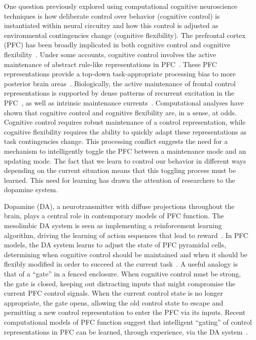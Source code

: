 One question previously explored using computational cognitive neuroscience techniques is how deliberate control over behavior (cognitive control) is instantiated within neural circuitry and how this control is adjusted as environmental contingencies change (cognitive flexibility). The prefrontal cortex (PFC) has been broadly implicated in both cognitive control and cognitive flexibility~\cite{Stuss:2000:WCSTLesion,Stuss:2001:StroopLesion}. Under some accounts, cognitive control involves the active maintenance of abstract rule-like representations in PFC~\cite{NoelleDC:2012:Rules}. These PFC representations provide a top-down task-appropriate processing bias to more posterior brain areas~\cite{CohenJD:1990:Stroop,RefWorks:154}. Biologically, the active maintenance of frontal control representations is supported by dense patterns of recurrent excitation in the PFC~\cite{PucakML:1996:Stripes}, as well as intrinsic maintenance currents~\cite{Goldman-RakicPS:1987:PFC_Maintenance}. Computational analyses have shown that cognitive control and cognitive flexibility are, in a sense, at odds. Cognitive control requires robust maintenance of a control representation, while cognitive flexibility requires the ability to quickly adapt these representations as task contingencies change. This processing conflict suggests the need for a mechanism to intelligently toggle the PFC between a maintenance mode and an updating mode. The fact that we learn to control our behavior in different ways depending on the current situation means that this toggling process must be learned. This need for learning has drawn the attention of researchers to the dopamine system.   

Dopamine (DA), a neurotransmitter with diffuse projections throughout the brain, plays a central role in contemporary models of PFC function. The mesolimbic DA system is seen as implementing a reinforcement learning algorithm, driving the learning of action sequences that lead to reward~\cite{MontaguePR:1996:Dopamine,BartoAG:1994:TDLearning}. In PFC models, the DA system learns to adjust the state of PFC pyramidal cells, determining when cognitive control should be maintained and when it should be flexibly modified in order to succeed at the current task~\cite{BraverTS:2000:Control,RougierNP:2005:XT}. A useful analogy is that of a ``gate'' in a fenced enclosure. When cognitive control must be strong, the gate is closed, keeping out distracting inputs that might compromise the current PFC control signals. When the current control state is no longer appropriate, the gate opens, allowing the old control state to escape and permitting a new control representation to enter the PFC via its inputs.  Recent computational models of PFC function suggest that intelligent ``gating'' of control representations in PFC can be learned, through experience, via the DA system~\cite{RougierNP:2005:XT,RougierNP:2002:TaskSwitching}. 

